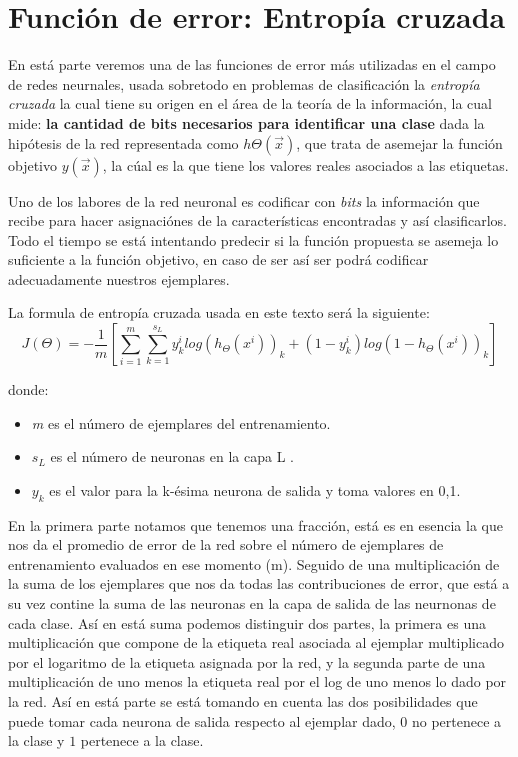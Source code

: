 \section{Función de error: Entropía cruzada}
En está parte veremos una de las funciones de error más utilizadas en el campo de redes neurnales, usada sobretodo en problemas de clasificación la \emph{entropía cruzada} la cual tiene su origen en el área de la teoría de la información, la cual mide: \textbf{la cantidad de bits necesarios para identificar una clase} dada la hipótesis de la red representada como $h\Theta (\vec{x}) $, que trata de asemejar la función objetivo $y(\vec{x})$, la cúal es la que tiene los valores reales asociados a las etiquetas.

Uno de los labores de la red neuronal es codificar con \emph{bits} la información que recibe para hacer asignaciónes de la características encontradas y así clasificarlos. Todo el tiempo se está intentando predecir si la función propuesta se asemeja lo suficiente a la función objetivo, en caso de ser así ser podrá codificar adecuadamente nuestros ejemplares.

La formula de entropía cruzada usada en este texto será la siguiente:
 \begin{equation}
  J (\Theta) = -\dfrac{1}{m}\left[\sum_{i=1}^{m}\sum_{k=1}^{s_{L}}y_{k}^{i} log( h_{\Theta}(x^i))_{k}+(1-y_{k}^{i})log(1- h_{\Theta}(x^i))_{k}  \right]  
 \end{equation}

 donde:
 \begin{itemize}
  \item \emph{m} es el número de ejemplares del entrenamiento.
  \item \emph{$s_{L}$} es el número de neuronas en la capa L .
  \item \emph{$y_{k}$} es el valor para la k-ésima neurona de salida y toma valores en {0,1}.

 \end{itemize}
  
En la primera parte notamos que tenemos una fracción, está es en esencia la que nos da el promedio de error de la red sobre el número de ejemplares de entrenamiento evaluados en ese momento (m). Seguido de una multiplicación de la suma de los ejemplares que nos da todas las contribuciones de error, que está a su vez contine la suma de las neuronas en la capa de salida de las neurnonas de cada clase. Así en está suma podemos distinguir dos partes, la primera es una multiplicación que compone de la etiqueta real asociada al ejemplar multiplicado por el logaritmo de la etiqueta asignada por la red, y la segunda parte de una multiplicación de uno menos la etiqueta real por el log de uno menos lo dado por la red. Así en está parte se está tomando en cuenta las dos posibilidades que puede tomar cada neurona de salida respecto al ejemplar dado, $0$ no pertenece a la clase y $1$ pertenece a la clase. 

